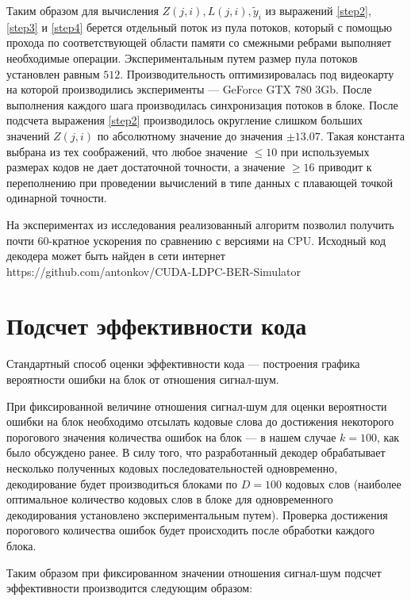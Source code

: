 Таким образом для вычисления $Z(j,i),L(j,i),\widetilde{y}_i$ из выражений \ref{step2}, \ref{step3} 
и \ref{step4} берется отдельный поток из пула потоков, который с помощью прохода по соответствующей области
памяти со смежными ребрами выполняет необходимые операции. Экспериментальным путем размер пула потоков
установлен равным $512$. Производительность оптимизировалась под видеокарту на которой производились
 эксперименты --- GeForce GTX 780 3Gb. После выполнения каждого шага производилась синхронизация потоков
 в блоке. После подсчета выражения \ref{step2} производилось округление слишком больших значений $Z(j,i)$ по
 абсолютному значение до значения $\pm 13.07$. Такая константа выбрана из тех соображений, что любое
 значение $\leq 10$ при используемых размерах кодов не дает достаточной точности, а значение $\geq 16$
 приводит к переполнению при проведении вычислений в типе данных с плавающей точкой одинарной точности.
 
 На экспериментах из исследования реализованный алгоритм позволил получить почти 60-кратное ускорения
 по сравнению с версиями на CPU. Исходный код декодера может быть найден в сети интернет
 https://github.com/antonkov/CUDA-LDPC-BER-Simulator
 

\section{Подсчет эффективности кода}

Стандартный способ оценки эффективности кода --- построения
графика вероятности ошибки на блок от отношения сигнал-шум.

При фиксированной величине отношения сигнал-шум для оценки вероятности
ошибки на блок необходимо отсылать кодовые слова до достижения некоторого порогового
значения количества ошибок на блок --- в нашем случае $k=100$, как было обсуждено ранее.
В силу того, что разработанный декодер обрабатывает несколько полученных
кодовых последовательностей одновременно, декодирование будет производиться
блоками по $D=100$ кодовых слов (наиболее оптимальное количество кодовых слов в блоке для 
одновременного декодирования установлено экспериментальным путем).
Проверка достижения порогового количества ошибок будет происходить после
обработки каждого блока.

Таким образом при фиксированном значении отношения сигнал-шум подсчет эффективности
производится следующим образом:


